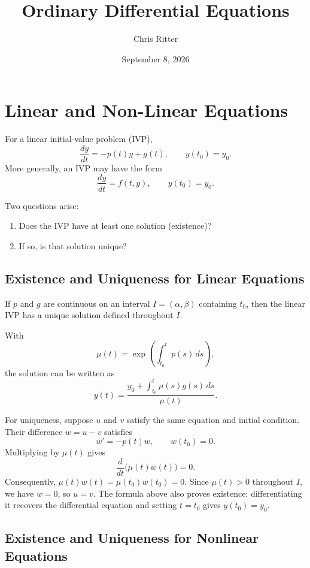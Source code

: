 \documentclass[11pt]{article}
\title{Ordinary Differential Equations}
\author{Chris Ritter}
\date{September 8, 2026}
\begin{document}
\maketitle
\tableofcontents
\newpage

\section{Linear and Non-Linear Equations}

For a linear initial-value problem (IVP),
\[
\frac{dy}{dt}=-p(t)y+g(t), \qquad y(t_0)=y_0.
\]
More generally, an IVP may have the form
\[
\frac{dy}{dt}=f(t,y), \qquad y(t_0)=y_0.
\]

Two questions arise:
\begin{enumerate}
    \item Does the IVP have at least one solution (existence)?
    \item If so, is that solution unique?
\end{enumerate}

\subsection{Existence and Uniqueness for Linear Equations}

If \(p\) and \(g\) are continuous on an interval
\(I=(\alpha,\beta)\) containing \(t_0\), then the linear IVP has a
unique solution defined throughout \(I\).

With
\[
\mu(t)=\exp\!\left(\int_{t_0}^{t}p(s)\,ds\right),
\]
the solution can be written as
\[
y(t)=\frac{y_0+\displaystyle\int_{t_0}^{t}\mu(s)g(s)\,ds}{\mu(t)}.
\]

For uniqueness, suppose \(u\) and \(v\) satisfy the same equation and
initial condition. Their difference \(w=u-v\) satisfies
\[
w'=-p(t)w, \qquad w(t_0)=0.
\]
Multiplying by \(\mu(t)\) gives
\[
\frac{d}{dt}\bigl(\mu(t)w(t)\bigr)=0.
\]
Consequently, \(\mu(t)w(t)=\mu(t_0)w(t_0)=0\). Since
\(\mu(t)>0\) throughout \(I\), we have \(w=0\), so \(u=v\).
The formula above also proves existence: differentiating it recovers
the differential equation and setting \(t=t_0\) gives \(y(t_0)=y_0\).

\subsection{Existence and Uniqueness for Nonlinear Equations}
\end{document}
